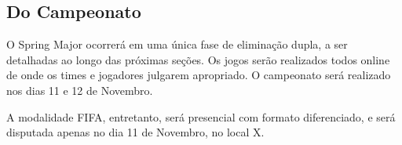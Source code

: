 \subsection{Do Campeonato}

O Spring Major ocorrerá em uma única fase de eliminação dupla, a ser detalhadas ao longo das próximas seções. Os jogos serão realizados todos online de onde os times e jogadores julgarem apropriado. O campeonato será realizado nos dias 11 e 12 de Novembro.

A modalidade FIFA, entretanto, será presencial com formato diferenciado, e será disputada apenas no dia 11 de Novembro, no local X.